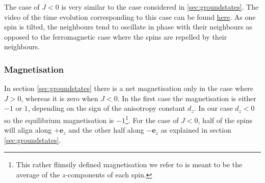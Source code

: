The case of $J<0$ is very similar to the case considered in \ref{sec:groundstates}. The video of the time evolution corresponding to this case can be found \href{https://folk.ntnu.no/sondrdl/spinwaves/coupled_spins_anti.mp4}{here}. As one spin is tilted, the neighbours tend to oscillate in phase with their neighbours as opposed to the ferromagnetic case where the spins are repelled by their neighbours. 

\subsubsection{Magnetisation}

In section \ref{sec:groundstates} there is a net magnetisation only in the case where $J>0$, whereas it is zero when $J<0$. In the first case the magnetisation is either $-1$ or $1$, depending on the sign of the anisotropy constant $d_z$. In our case $d_z < 0$ so the equilibrium magnetisation is $-1$\footnote{This rather flimsily defined magnetisation we refer to is meant to be the average of the $z$-components of each spin.}. For the case of $J<0$, half of the spins will align along $+\mathbf{e}_z$ and the other half along $-\mathbf{e}_z$ as explained in section \ref{sec:groundstates}.